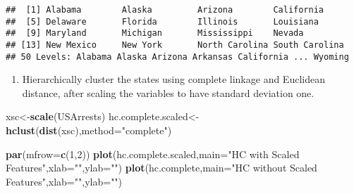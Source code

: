 \documentclass[]{article}
\newenvironment{Shaded}{\begin{snugshade}}{\end{snugshade}}
\newcommand{\KeywordTok}[1]{\textcolor[rgb]{0.13,0.29,0.53}{\textbf{#1}}}
\newcommand{\DataTypeTok}[1]{\textcolor[rgb]{0.13,0.29,0.53}{#1}}
\newcommand{\DecValTok}[1]{\textcolor[rgb]{0.00,0.00,0.81}{#1}}
\newcommand{\StringTok}[1]{\textcolor[rgb]{0.31,0.60,0.02}{#1}}
\newcommand{\CommentTok}[1]{\textcolor[rgb]{0.56,0.35,0.01}{\textit{#1}}}
\newcommand{\OperatorTok}[1]{\textcolor[rgb]{0.81,0.36,0.00}{\textbf{#1}}}
\newcommand{\NormalTok}[1]{#1}
\providecommand{\tightlist}{%
  \setlength{\itemsep}{0pt}\setlength{\parskip}{0pt}}
\begin{document}
\begin{verbatim}
##  [1] Alabama        Alaska         Arizona        California    
##  [5] Delaware       Florida        Illinois       Louisiana     
##  [9] Maryland       Michigan       Mississippi    Nevada        
## [13] New Mexico     New York       North Carolina South Carolina
## 50 Levels: Alabama Alaska Arizona Arkansas California ... Wyoming
\end{verbatim}

\begin{Shaded}
\end{Shaded}

\begin{enumerate}
\def\labelenumi{(\alph{enumi})}
\setcounter{enumi}{2}
\tightlist
\item
  Hierarchically cluster the states using complete linkage and Euclidean
  distance, after scaling the variables to have standard deviation one.
\end{enumerate}

\begin{Shaded}
\begin{Highlighting}[]
\NormalTok{xsc<-}\KeywordTok{scale}\NormalTok{(USArrests)}
\NormalTok{hc.complete.scaled<-}\KeywordTok{hclust}\NormalTok{(}\KeywordTok{dist}\NormalTok{(xsc),}\DataTypeTok{method=}\StringTok{"complete"}\NormalTok{)}

\KeywordTok{par}\NormalTok{(}\DataTypeTok{mfrow=}\KeywordTok{c}\NormalTok{(}\DecValTok{1}\NormalTok{,}\DecValTok{2}\NormalTok{))}
\KeywordTok{plot}\NormalTok{(hc.complete.scaled,}\DataTypeTok{main=}\StringTok{"HC with Scaled Features"}\NormalTok{,}\DataTypeTok{xlab=}\StringTok{""}\NormalTok{,}\DataTypeTok{ylab=}\StringTok{""}\NormalTok{)}
\KeywordTok{plot}\NormalTok{(hc.complete,}\DataTypeTok{main=}\StringTok{"HC without Scaled Features"}\NormalTok{,}\DataTypeTok{xlab=}\StringTok{""}\NormalTok{,}\DataTypeTok{ylab=}\StringTok{""}\NormalTok{)}
\end{Highlighting}
\end{Shaded}
\end{document}
